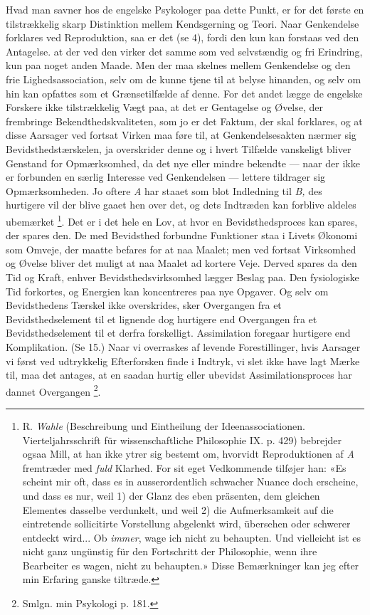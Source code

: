 \documentclass[12pt,a4paper,openany]{book}
\newcommand{\opage}[1]{\marginnote{\footnotesize\textit{[#1]}}}
\begin{document}
Hvad man savner hos de engelske Psykologer paa dette Punkt, er for det første
en tilstrækkelig skarp Distinktion mellem Kendsgerning og Teori. Naar
Genkendelse forklares ved Reproduktion, saa er det (se 4), fordi den kun kan
forstaas ved den Antagelse.
\setcounter{footnote}{0}%
\opage{41}at der ved den virker det samme som ved selvstændig og fri Erindring,
kun paa noget anden Maade. Men der maa skelnes mellem Genkendelse og den frie
Lighedsassociation, selv om de kunne tjene til at belyse hinanden, og selv om
hin kan opfattes som et Grænsetilfælde af denne. For det andet lægge de
engelske Forskere ikke tilstrækkelig Vægt paa, at det er Gentagelse og Øvelse,
der frembringe Bekendthedskvaliteten, som jo er det Faktum, der skal forklares,
og at disse Aarsager ved fortsat Virken maa føre til, at Genkendelsesakten
nærmer sig Bevidsthedstærskelen, ja overskrider denne og i hvert Tilfælde
vanskeligt bliver Genstand for Opmærksomhed, da det nye eller mindre bekendte
--- naar der ikke er forbunden en særlig Interesse ved Genkendelsen --- lettere
tildrager sig Opmærksomheden. Jo oftere \textit{A} har staaet som blot
Indledning til \textit{B,} des hurtigere vil der blive gaaet hen over det, og
dets Indtræden kan forblive aldeles ubemærket%
\footnote[1]{R. \emph{Wahle} (Beschreibung und Eintheilung der
Ideenassociationen. Vierteljahrsschrift für wissenschaftliche Philosophie IX.
p. 429) bebrejder ogsaa Mill, at han ikke ytrer sig bestemt om, hvorvidt
Reproduktionen af \textit{A} fremtræder med \emph{fuld} Klarhed. For sit eget
Vedkommende tilføjer han: «Es scheint mir oft, dass es in ausserordentlich
schwacher Nuance doch erscheine, und dass es nur, weil 1) der Glanz des eben
präsenten, dem gleichen Elementes dasselbe verdunkelt, und weil 2) die
Aufmerksamkeit auf die eintretende sollicitirte Vorstellung abgelenkt wird,
übersehen oder schwerer entdeckt wird... Ob \emph{immer}, wage ich nicht zu
behaupten. Und vielleicht ist es nicht ganz ungünstig für den Fortschritt der
Philosophie, wenn ihre Bearbeiter es wagen, nicht zu behaupten.» Disse
Bemærkninger kan jeg efter min Erfaring ganske tiltræde.}. Det er i det hele en
Lov, at hvor en Bevidsthedsproces kan spares, der spares den. De med Bevidsthed
forbundne Funktioner staa i Livets Økonomi som Omveje, der maatte befares for
at naa Maalet; men ved fortsat Virksomhed og Øvelse bliver det muligt at naa
Maalet ad kortere Veje. Derved spares da den Tid og Kraft, enhver
Bevidsthedsvirksomhed lægger Beslag paa. Den fysiologiske Tid forkortes, og
Energien kan koncentreres paa nye Opgaver. Og selv om Bevidsthedens Tærskel
ikke overskrides, sker Overgangen fra et Bevidsthedselement til et lignende dog
hurtigere end Overgangen fra et Bevidsthedselement til et derfra forskelligt.
Assimilation foregaar hurtigere end Komplikation. (Se 15.) Naar vi overraskes
af levende Forestillinger, hvis Aarsager vi først ved udtrykkelig Efterforsken
finde i Indtryk, vi slet ikke have lagt Mærke til, maa det antages, at en
saadan hurtig eller ubevidst Assimilationsproces har dannet Overgangen%
\footnote[2]{Smlgn. min Psykologi p. 181.}.
\end{document}
